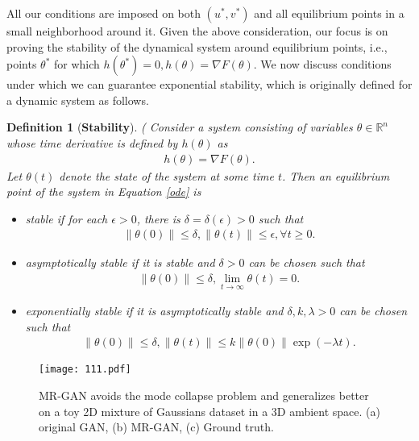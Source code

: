 \documentclass[10pt,twocolumn,letterpaper]{article}
\newtheorem{definition}{Definition}
\begin{document}
All our conditions
are imposed on both $(u^\ast, v^\ast)$ and all equilibrium points in a small neighborhood around it.
Given the above consideration, our focus is on proving the stability of the dynamical system around
equilibrium points, i.e., points $\theta^\ast$ for which $h(\theta^\ast)=0, h(\theta)=\nabla F(\theta)$. 
We now discuss conditions under which we can guarantee exponential stability, which is originally defined for a dynamic system as follows.
\begin{definition}[\textbf{Stability}]
	(\cite{khalil1996noninear} Consider a system consisting of variables $\theta\in \mathbb{R}^n$ whose time derivative is defined by $h(\theta)$ as
	\begin{align}\label{ode}
	h(\theta)=\nabla F(\theta).
	\end{align}
	Let $\theta(t)$ denote the state of the system at some time $t$. Then an equilibrium point of the system in Equation \eqref{ode} is 
	\begin{itemize}
		\item stable if for each $\epsilon>0$, there is $\delta=\delta(\epsilon)>0$ such that
		\begin{align}
		\|\theta(0)\|\le \delta, \|\theta(t)\|\le \epsilon, \forall t\ge 0.
		\end{align}
		
		\item asymptotically stable if it is stable and $\delta >0$ can be chosen such that
		\begin{align}
		\|\theta(0)\|\le \delta, \lim_{t\rightarrow \infty } \theta(t) =0.
		\end{align}
		
		\item 
		exponentially stable if it is asymptotically stable and $\delta, k, \lambda >0$ can be chosen such that 
		\begin{align}
		\|\theta(0)\|\le \delta, \|\theta(t)\|\le k \|\theta(0)\|\exp(-\lambda t).
		\end{align}
	\end{itemize}
\end{definition}

\begin{figure*}
    \centering
     \texttt{[image: 111.pdf]}
    \caption{MR-GAN avoids the mode collapse problem and generalizes better on a toy 2D mixture of Gaussians
dataset in a 3D ambient space. (a) original GAN, (b) MR-GAN, (c) Ground truth.} 
    \label{fig:Gaussian_Mixture}
\end{figure*}
\end{document}
